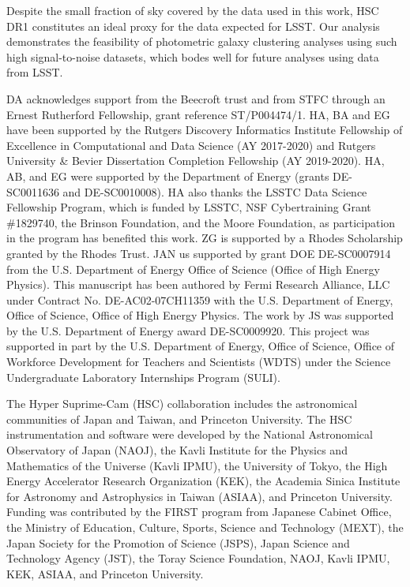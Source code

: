 \documentclass[a4paper,11pt]{article}
\begin{document}
Despite the small fraction of sky covered by the data used in this work, HSC DR1 constitutes an ideal proxy for the data expected for LSST. Our analysis demonstrates the feasibility of photometric galaxy clustering analyses using such high signal-to-noise datasets, which bodes well for future analyses using data from LSST.


\acknowledgments

DA acknowledges support from the Beecroft trust and from STFC through
an Ernest Rutherford Fellowship, grant reference ST/P004474/1.  HA, BA
and EG have been supported by the Rutgers Discovery Informatics
Institute Fellowship of Excellence in Computational and Data Science
(AY 2017-2020) and Rutgers University \& Bevier Dissertation
Completion Fellowship (AY 2019-2020). HA, AB, and EG were supported by
the Department of Energy (grants DE-SC0011636 and DE-SC0010008). HA
also thanks the LSSTC Data Science Fellowship Program, which is funded
by LSSTC, NSF Cybertraining Grant \#1829740, the Brinson Foundation,
and the Moore Foundation, as participation in the program has
benefited this work. ZG is supported by a Rhodes Scholarship granted
by the Rhodes Trust. JAN us supported by grant DOE DE-SC0007914 from
the U.S. Department of Energy Office of Science (Office of High Energy
Physics). This manuscript has been authored by Fermi Research
Alliance, LLC under Contract No. DE-AC02-07CH11359 with the
U.S. Department of Energy, Office of Science, Office of High Energy
Physics. The work by JS was supported by the U.S. Department of Energy
award DE-SC0009920. This project was supported in part by the
U.S. Department of Energy, Office of Science, Office of Workforce
Development for Teachers and Scientists (WDTS) under the Science
Undergraduate Laboratory Internships Program (SULI).

The Hyper Suprime-Cam (HSC) collaboration includes the astronomical communities of Japan and Taiwan, and Princeton University. The HSC instrumentation and software were developed by the National Astronomical Observatory of Japan (NAOJ), the Kavli Institute for the Physics and Mathematics of the Universe (Kavli IPMU), the University of Tokyo, the High Energy Accelerator Research Organization (KEK), the Academia Sinica Institute for Astronomy and Astrophysics in Taiwan (ASIAA), and Princeton University. Funding was contributed by the FIRST program from Japanese Cabinet Office, the Ministry of Education, Culture, Sports, Science and Technology (MEXT), the Japan Society for the Promotion of Science (JSPS), Japan Science and Technology Agency (JST), the Toray Science Foundation, NAOJ, Kavli IPMU, KEK, ASIAA, and Princeton University. 
\end{document}

